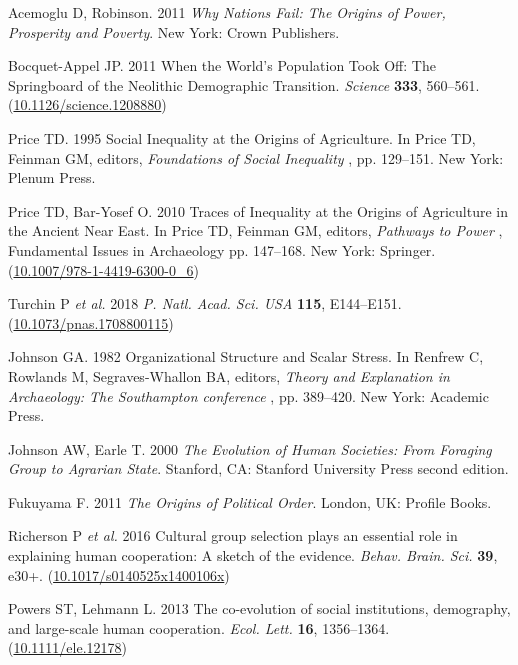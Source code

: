 \documentclass{rstb}
\begin{document}
\begin{thebibliography}{99}
Acemoglu D, Robinson. 2011 {\em Why Nations Fail: {The} Origins of Power,
  Prosperity and Poverty}.
New York: Crown Publishers.

Bocquet-Appel JP. 2011  When the World's Population Took Off: {The} Springboard
  of the {Neolithic Demographic Transition}. {\em Science} \textbf{333},
  560--561.
(\href{http://dx.doi.org/10.1126/science.1208880}{10.1126/science.1208880})

Price TD. 1995  Social Inequality at the Origins of Agriculture. In Price TD,
  Feinman GM, editors, {\em Foundations of Social Inequality} ,  pp. 129--151.
  New York: Plenum Press.

Price TD, Bar-Yosef O. 2010  Traces of Inequality at the Origins of Agriculture
  in the Ancient {Near East}. In Price TD, Feinman GM, editors, {\em Pathways
  to Power} ,  Fundamental Issues in Archaeology pp. 147--168. New York:
  Springer.
(\href{http://dx.doi.org/10.1007/978-1-4419-6300-0\_6}{10.1007/978-1-4419-6300-0\_6})

Turchin P \textit{et al.} 2018 {\em P. Natl. Acad. Sci. USA}
  \textbf{115}, E144--E151.
  (\href{http://dx.doi.org/10.1073/pnas.1708800115}{10.1073/pnas.1708800115})

Johnson GA. 1982  Organizational Structure and Scalar Stress. In Renfrew C,
  Rowlands M, Segraves-Whallon BA, editors, {\em Theory and Explanation in
  Archaeology: {The} Southampton conference} ,  pp. 389--420. New York:
  Academic Press.

Johnson AW, Earle T. 2000 {\em The Evolution of Human Societies: From Foraging
  Group to Agrarian State}.
Stanford, CA: Stanford University Press second edition.

Fukuyama F. 2011 {\em The Origins of Political Order}.
London, UK: Profile Books.

Richerson P \textit{et al.} 2016
  Cultural group selection plays an essential role in explaining human
  cooperation: A sketch of the evidence. {\em Behav. Brain. Sci.} \textbf{39},
  {e30}+.
(\href{http://dx.doi.org/10.1017/s0140525x1400106x}{10.1017/s0140525x1400106x})

Powers ST, Lehmann L. 2013  The co-evolution of social institutions,
  demography, and large-scale human cooperation. {\em Ecol. Lett.}
  \textbf{16}, 1356--1364.
(\href{http://dx.doi.org/10.1111/ele.12178}{10.1111/ele.12178})


\end{thebibliography}
\end{document}
